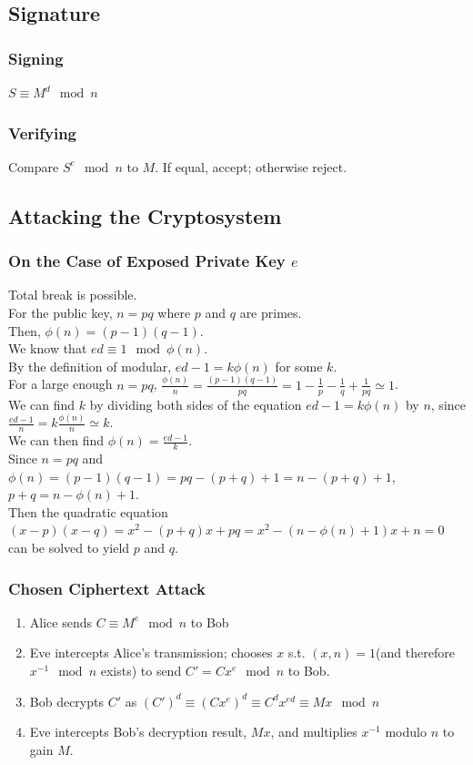 \documentclass{report}
\begin{document}
		\subsection{Signature}
			\subsubsection{Signing}
			$S \equiv M^d \mod n$
			
			\subsubsection{Verifying}
			Compare $S^e \mod n$ to $M$. If equal, accept; otherwise reject.
		
		\subsection{Attacking the Cryptosystem}
			\subsubsection{On the Case of Exposed Private Key $e$}
			Total break is possible.\\
			For the public key, $n=pq$ where $p$ and $q$ are primes.\\
			Then, $\phi(n)=(p-1)(q-1)$.\\
			We know that $ed \equiv 1 \mod \phi(n)$.\\
			By the definition of modular, $ed-1=k \phi(n)$ for some $k$.\\
			For a large enough $n=pq$, $\frac{\phi(n)}{n} = \frac{(p-1)(q-1)}{pq} = 1 - \frac{1}{p} - \frac{1}{q} +\frac{1}{pq}  \simeq 1$.\\
			We can find $k$ by dividing both sides of the equation $ed-1=k \phi(n)$ by $n$, since $\frac{ed-1}{n}=k\frac{\phi(n)}{n} \simeq k$.\\
			We can then find $\phi(n)=\frac{ed-1}{k}$.\\
			Since $n=pq$ and $\phi(n)=(p-1)(q-1)=pq-(p+q)+1=n-(p+q)+1$, $p+q=n-\phi(n)+1$.\\
			Then the quadratic equation $(x-p)(x-q)=x^2-(p+q)x+pq=x^2-(n-\phi(n)+1)x+n=0$ can be solved to yield $p$ and $q$.
			
			\subsubsection{Chosen Ciphertext Attack}
			\begin{enumerate}
				\item Alice sends $C\equiv M^e \mod n$ to Bob
				\item Eve intercepts Alice's transmission; chooses $x$ s.t. $(x,n)=1$(and therefore $x^{-1} \mod n$ exists) to send $C'=Cx^e \mod n$ to Bob.
				\item Bob decrypts $C'$ as $(C')^d \equiv (Cx^e)^d \equiv C^d x^{ed} \equiv Mx \mod n$
				\item Eve intercepts Bob's decryption result, $Mx$, and multiplies $x^{-1}$ modulo $n$ to gain $M$.
			\end{enumerate}
			
\end{document}
